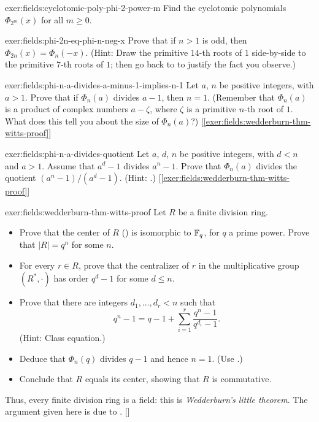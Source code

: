\begin{exer}{}{exer:fields:cyclotomic-poly-phi-2-power-m}
  Find the cyclotomic polynomials $\Phi_{2^m}(x)$ for all $m \geq 0$.
\end{exer}
\begin{exer}{}{exer:fields:phi-2n-eq-phi-n-neg-x}
  Prove that if $n > 1$ is odd, then $\Phi_{2n}(x) =
  \Phi_n(-x)$. (Hint: Draw the primitive $14$-th roots of $1$
  side-by-side to the primitive $7$-th roots of $1$; then go back to
   to justify the fact you observe.)
\end{exer}
\begin{exer}{}{exer:fields:phi-n-a-divides-a-minus-1-implies-n-1}
  Let $a$, $n$ be positive integers, with $a > 1$. Prove that if
  $\Phi_n(a)$ divides $a - 1$, then $n = 1$. (Remember that
  $\Phi_n(a)$ is a product of complex numbers $a - \zeta$, where
  $\zeta$ is a primitive $n$-th root of $1$. What does this tell you
  about the size of $\Phi_n(a)$?)
  [\ref{exer:fields:wedderburn-thm-witts-proof}]
\end{exer}
\begin{exer}{}{exer:fields:phi-n-a-divides-quotient}
  Let $a$, $d$, $n$ be positive integers, with $d < n$ and $a >
  1$. Assume that $a^d - 1$ divides $a^n - 1$. Prove that $\Phi_n(a)$
  divides the quotient $(a^n - 1)/(a^d - 1)$. (Hint:
  .)
  [\ref{exer:fields:wedderburn-thm-witts-proof}]
\end{exer}
\begin{exer}{}{exer:fields:wedderburn-thm-witts-proof}
  Let $R$ be a finite division ring.
  \begin{itemize}
  \item Prove that the center of $R$
    () is isomorphic to $\mathbb{F}_q$, for
    $q$ a prime power. Prove that $|R| = q^n$ for some $n$.
  \item For every $r \in R$, prove that the centralizer of $r$ in the
    multiplicative group $(R^*, \cdot)$ has order $q^d - 1$ for some
    $d \leq n$.
  \item Prove that there are integers $d_1, \dots, d_r < n$ such that
    \[
      \tag{$*$} q^n - 1 = q - 1 + \sum_{i=1}^r \frac{q^n - 1}{q^{d_i}
        - 1}.
    \]
    (Hint: Class equation.)
  \item Deduce that $\Phi_n(q)$ divides $q - 1$ and hence $n =
    1$. (Use
    .)
  \item Conclude that $R$ equals its center, showing that $R$ is
    commutative.
  \end{itemize}
  Thus, every finite division ring is a field: this is
  \emph{Wedderburn's little theorem}. The argument given here is due
  to .
  []
\end{exer}
